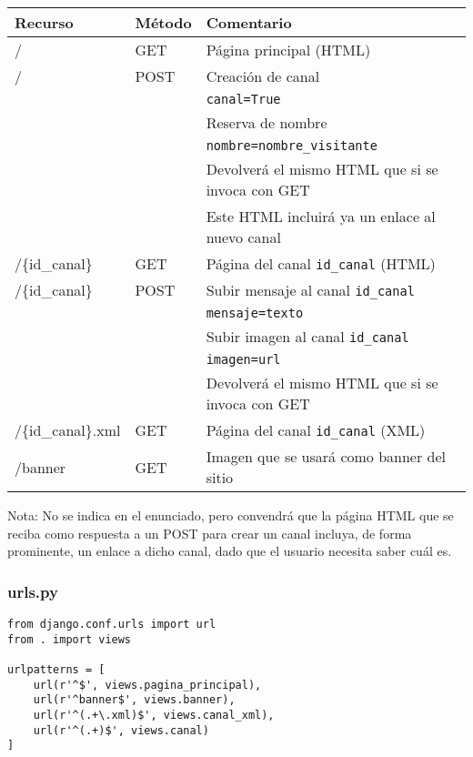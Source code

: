 \begin{tabular}{|l|l|l|}
  \hline
  Recurso & Método & Comentario \\ \hline \hline
  /       & GET    & Página principal (HTML) \\ \hline
  /       & POST   & Creación de canal \\
          &        & \verb|canal=True| \\
          &        & Reserva de nombre \\
          &        & \verb|nombre=nombre_visitante| \\
          &        & Devolverá el mismo HTML que si se invoca con GET \\
          &        & Este HTML incluirá ya un enlace al nuevo canal \\ \hline
  /\{id\_canal\} & GET & Página del canal \verb|id_canal| (HTML) \\ \hline
  /\{id\_canal\} & POST & Subir mensaje al canal \verb|id_canal| \\
          &        & \verb|mensaje=texto| \\
          &        & Subir imagen al canal \verb|id_canal| \\ 
          &        & \verb|imagen=url| \\
          &        & Devolverá el mismo HTML que si se invoca con GET \\ \hline
  /\{id\_canal\}.xml & GET & Página del canal \verb|id_canal| (XML) \\ \hline
  /banner & GET & Imagen que se usará como banner del sitio \\ \hline
\end{tabular}

\vspace{.3cm}

Nota: No se indica en el enunciado, pero convendrá que la página HTML que se reciba como respuesta a un POST para crear un canal incluya, de forma prominente, un enlace a dicho canal, dado que el usuario necesita saber cuál es.

\subsubsection*{urls.py}

\begin{verbatim}
from django.conf.urls import url
from . import views

urlpatterns = [
    url(r'^$', views.pagina_principal),
    url(r'^banner$', views.banner),
    url(r'^(.+\.xml)$', views.canal_xml),
    url(r'^(.+)$', views.canal)
]
\end{verbatim}

